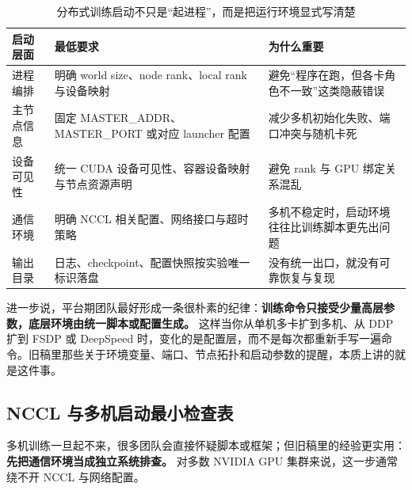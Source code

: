 \begin{table}[H]
\centering
\small
\begin{tabularx}{\textwidth}{>{\raggedright\arraybackslash}p{3cm}>{\raggedright\arraybackslash}p{3.5cm}>{\raggedright\arraybackslash}X}
\toprule
\textbf{启动层面} & \textbf{最低要求} & \textbf{为什么重要} \\
\midrule
进程编排 & 明确 world size、node rank、local rank 与设备映射 & 避免“程序在跑，但各卡角色不一致”这类隐蔽错误 \\
主节点信息 & 固定 MASTER\_ADDR、MASTER\_PORT 或对应 launcher 配置 & 减少多机初始化失败、端口冲突与随机卡死 \\
设备可见性 & 统一 CUDA 设备可见性、容器设备映射与节点资源声明 & 避免 rank 与 GPU 绑定关系混乱 \\
通信环境 & 明确 NCCL 相关配置、网络接口与超时策略 & 多机不稳定时，启动环境往往比训练脚本更先出问题 \\
输出目录 & 日志、checkpoint、配置快照按实验唯一标识落盘 & 没有统一出口，就没有可靠恢复与复现 \\
\bottomrule
\end{tabularx}
\caption{分布式训练启动不只是“起进程”，而是把运行环境显式写清楚}
\label{tab:launch-discipline}
\end{table}

进一步说，平台期团队最好形成一条很朴素的纪律：\textbf{训练命令只接受少量高层参数，底层环境由统一脚本或配置生成。} 这样当你从单机多卡扩到多机、从 DDP 扩到 FSDP 或 DeepSpeed 时，变化的是配置层，而不是每次都重新手写一遍命令。旧稿里那些关于环境变量、端口、节点拓扑和启动参数的提醒，本质上讲的就是这件事。

\subsection{NCCL 与多机启动最小检查表}
多机训练一旦起不来，很多团队会直接怀疑脚本或框架；但旧稿里的经验更实用：\textbf{先把通信环境当成独立系统排查。} 对多数 NVIDIA GPU 集群来说，这一步通常绕不开 NCCL 与网络配置。


